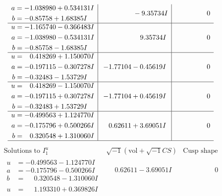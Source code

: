 \documentclass[1p]{elsarticle_modified}
\theoremstyle{definition}
\newcommand{\I}{\sqrt{-1}}
\begin{document}
$$\begin{array}{c|c|c}
\begin{aligned}
a &= -1.038980 + 0.534131 I \\
b &= -0.85758 + 1.68385 I\end{aligned}
 & \phantom{-0.000000 } -9.35734 I & \phantom{-0.000000 } 0 \\ \hline\begin{aligned}
u &= -1.165740 - 0.366483 I \\
a &= -1.038980 - 0.534131 I \\
b &= -0.85758 - 1.68385 I\end{aligned}
 & \phantom{-0.000000 -}9.35734 I & \phantom{-0.000000 } 0 \\ \hline\begin{aligned}
u &= \phantom{-}0.418269 + 1.150070 I \\
a &= -0.197115 - 0.307278 I \\
b &= -0.32483 - 1.53729 I\end{aligned}
 & -1.77104 - 0.45619 I & \phantom{-0.000000 } 0 \\ \hline\begin{aligned}
u &= \phantom{-}0.418269 - 1.150070 I \\
a &= -0.197115 + 0.307278 I \\
b &= -0.32483 + 1.53729 I\end{aligned}
 & -1.77104 + 0.45619 I & \phantom{-0.000000 } 0 \\ \hline\begin{aligned}
u &= -0.499563 + 1.124770 I \\
a &= -0.175796 + 0.500266 I \\
b &= \phantom{-}0.320548 + 1.310060 I\end{aligned}
 & \phantom{-}0.62611 + 3.69051 I & \phantom{-0.000000 } 0\\
 \hline 
 \end{array}$$\newpage$$\begin{array}{c|c|c}  
\text{Solutions to }I^u_{1}& \I (\text{vol} + \sqrt{-1}CS) & \text{Cusp shape}\\
 \hline 
\begin{aligned}
u &= -0.499563 - 1.124770 I \\
a &= -0.175796 - 0.500266 I \\
b &= \phantom{-}0.320548 - 1.310060 I\end{aligned}
 & \phantom{-}0.62611 - 3.69051 I & \phantom{-0.000000 } 0 \\ \hline\begin{aligned}
u &= \phantom{-}1.193310 + 0.369826 I \\

\end{aligned}
\end{array}$$
\end{document}
